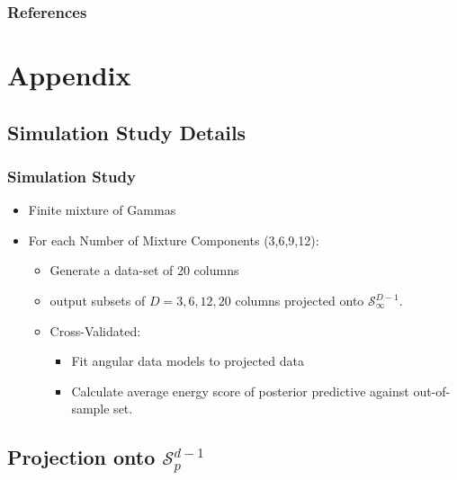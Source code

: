 \documentclass[aspectratio=169,10pt]{beamer}
\begin{document}
\appendix

\begin{frame}[allowframebreaks]
    \frametitle{References}
    \footnotesize
    
\end{frame}

\section*{Appendix}

\subsection*{Simulation Study Details}

\begin{frame}
    \label{pgpareto:simstudydetails}
    \frametitle{Simulation Study}
    \begin{itemize}
        \item Finite mixture of Gammas
        \item For each Number of Mixture Components (3,6,9,12):
            \begin{itemize}
                \item Generate a data-set of 20 columns
                \item output subsets of $D = 3,6,12,20$ columns projected 
                    onto $\mathcal{S}_{\infty}^{D-1}$.
                \item Cross-Validated:
                    \begin{itemize}
                        \item Fit angular data models to projected data
                        \item Calculate average energy score of posterior 
                            predictive against out-of-sample set.
                    \end{itemize}
            \end{itemize}
    \end{itemize}
    \hyperlink{pgpareto:simstudy}{}
\end{frame} %

\subsection*{Projection onto $\mathcal{S}_p^{d-1}$}
\end{document}
